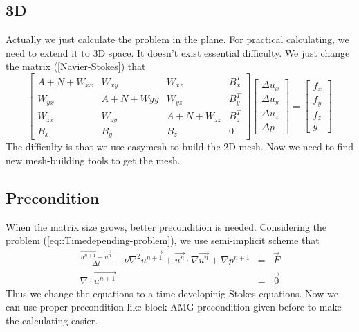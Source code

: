 \documentclass[a4paper]{article}
\begin{document}
\subsection{3D}
Actually we just calculate the problem in the plane. For practical calculating, we need to extend it to 3D space. It doesn't exist essential difficulty. We just change the matrix (\ref{Navier-Stokes}) that
\begin{equation}
\left[ \begin{array}{cccc}
A + N +W_{xx} & W_{xy} & W_{xz} & B_x^T \\
W_{yx} & A +N +W{yy}& W_{yz} & B_y^T \\
W_{zx} & W_{zy}  &A + N + W_{zz} & B_z^T \\
B_x & B_y &B_z& 0
\end{array}
\right]
\left[\begin{array}{cccc}
\Delta u_x\\
\Delta u_y\\
\Delta u_z\\
\Delta p
\end{array}
\right]=
\left[\begin{array}{cccc}
f_x\\
f_y\\
f_z\\
g
\end{array}
\right]
\label{3D-Navier-Stokes}
\end{equation}
The difficulty is that we use easymesh to build the 2D mesh. Now we need to find new mesh-building tools to get the mesh.
\subsection{Precondition}
When the matrix size grows, better precondition is needed. Considering the problem (\ref{eq::Timedepending-problem}), we use semi-implicit scheme that
\begin{equation}
\begin{array}{rcl}
\frac{\vec{u^{n+1}}-\vec{u^n}}{\Delta t} - \nu \nabla^2 \vec{u^{n+1}} + \vec{u^{n}}\cdot \nabla \vec{u^n} + \nabla p^{n+1} &=& \vec{F} \\
\nabla \cdot \vec{u^{n+1}} &=& \vec{0}
\label{eq::implicit and explicit}
\end{array}
\end{equation}
Thus we change the equations to a time-developinig Stokes equations. Now we can use proper precondition like block AMG precondition given before to make the calculating easier.



\end{document}
